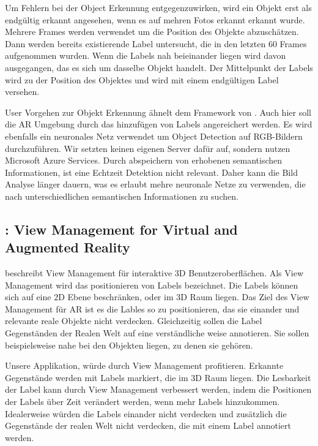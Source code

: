 Um Fehlern bei der Object Erkennung entgegenzuwirken, wird ein Objekt erst als endgültig erkannt angesehen, wenn es auf mehren Fotos erkannt erkannt wurde. Mehrere Frames werden verwendet um die Position des Objekte abzuschätzen. Dann werden bereits existierende Label untersucht, die in den letzten 60 Frames aufgenommen wurden. Wenn die Labels nah beieinander liegen wird davon ausgegangen, das es sich um dasselbe Objekt handelt. Der Mittelpunkt der Labels wird zu der Position des Objektes und wird mit einem endgültigen Label versehen.

User Vorgehen zur Objekt Erkennung ähnelt dem Framework von \cite{LabelingLanguageLearning}. Auch hier soll die AR Umgebung durch das hinzufügen von Labels angereichert werden. Es wird ebenfalls ein neuronales Netz verwendet um Object Detection auf RGB-Bildern durchzuführen. Wir setzten keinen eigenen Server dafür auf, sondern nutzen Microsoft Azure Services. Durch abspeichern von erhobenen semantischen Informationen, ist eine Echtzeit Detektion nicht relevant. Daher kann die Bild Analyse länger dauern, was es erlaubt mehre neuronale Netze zu verwenden, die nach unterschiedlichen semantischen Informationen zu suchen. 



\subsection{\cite{viewmanagement3d}: View Management for Virtual and Augmented Reality}

\cite{viewmanagement3d} beschreibt View Management für interaktive 3D Benutzeroberflächen. Als View Management wird das positionieren von Labels bezeichnet.
Die Labels können sich auf eine 2D Ebene beschränken, oder im 3D Raum liegen. Das Ziel des View Management für AR ist es die Lables so zu positionieren, das sie einander und relevante reale Objekte nicht verdecken. Gleichzeitig sollen die Label Gegenständen der Realen Welt  auf eine verständliche weise annotieren. Sie sollen beispielsweise nahe bei den Objekten liegen, zu denen sie gehören.

Unsere Applikation, würde durch View Management profitieren. Erkannte Gegenstände werden mit Labels markiert, die im 3D Raum liegen.  Die Lesbarkeit der Label kann durch View Management verbessert werden, indem die Positionen der Labels über Zeit verändert werden, wenn mehr Labels hinzukommen. Idealerweise würden die Labels einander nicht verdecken und zusätzlich die Gegenstände der realen Welt nicht verdecken, die mit einem Label annotiert werden. 

